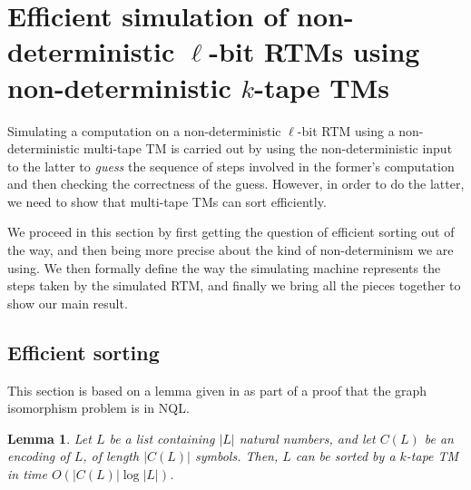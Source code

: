 \documentclass[english]{article}
\theoremstyle{plain}
\theoremstyle{definition}
\theoremstyle{plain}
\newtheorem{lem}[thm]{Lemma}
\begin{document}
\section{Efficient simulation of non-deterministic $\ell$-bit RTMs using non-deterministic $k$-tape TMs}

Simulating a computation on a non-deterministic $\ell$-bit RTM using a
non-deterministic multi-tape TM is carried out by using the
non-deterministic input to the latter to \emph{guess} the sequence of
steps involved in the former's computation and then checking the
correctness of the guess. However, in order to do the latter, we need
to show that multi-tape TMs can sort efficiently.

We proceed in this section by first getting the question of efficient
sorting out of the way, and then being more precise about the kind of
non-determinism we are using. We then formally define the way the
simulating machine represents the steps taken by the simulated RTM,
and finally we bring all the pieces together to show our main result.

\subsection{Efficient sorting}

This section is based on a lemma given in
\cite{Schnorr:1978:SQC:322047.322060} as part of a proof that the
graph isomorphism problem is in NQL.

\begin{lem}
  \label{efficient-sorting-lemma}
  Let $L$ be a list containing $|L|$ natural numbers, and let $C(L)$
  be an encoding of $L$, of length $|C(L)|$ symbols. Then, $L$ can be
  sorted by a $k$-tape TM in time $O(|C(L)|\log|L|)$.
\end{lem}
\end{document}
